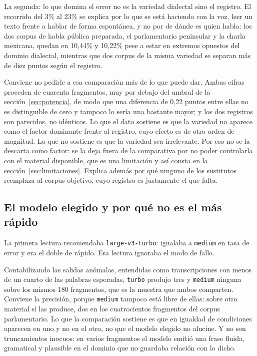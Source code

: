 La segunda: lo que domina el error no es la variedad dialectal sino el registro. El recorrido
del 3\% al 23\% se explica por lo que se está haciendo con la voz, leer un texto frente a
hablar de forma espontánea, y no por de dónde es quien habla: los dos corpus de habla
pública preparada, el parlamentario peninsular y la charla mexicana, quedan en 10,44\% y
10,22\% pese a estar en extremos opuestos del dominio dialectal, mientras que dos corpus de
la misma variedad se separan más de diez puntos según el registro.

Conviene no pedirle a esa comparación más de lo que puede dar. Ambas cifras proceden de
cuarenta fragmentos, muy por debajo del umbral de la sección~\ref{sec:potencia}, de modo que
una diferencia de 0,22 puntos entre ellas no es distinguible de cero y tampoco lo sería una
bastante mayor; y los dos registros son parecidos, no idénticos. Lo que el dato sostiene es
que la variedad no aparece como el factor dominante frente al registro, cuyo efecto es de
otro orden de magnitud. Lo que no sostiene es que la variedad sea irrelevante. Por eso no se
la descarta como factor: se la deja fuera de la comparativa por no poder controlarla con el
material disponible, que es una limitación y así consta en la sección~\ref{sec:limitaciones}.
Explica además por qué ninguno de los sustitutos reemplaza al corpus objetivo, cuyo registro
es justamente el que falta.

\subsection{El modelo elegido y por qué no es el más rápido}

La primera lectura recomendaba \texttt{large-v3-turbo}: igualaba a \texttt{medium} en tasa
de error y era el doble de rápido. Esa lectura ignoraba el modo de fallo.

Contabilizando las salidas anómalas, entendidas como transcripciones con menos de un cuarto
de las palabras esperadas, \texttt{turbo} produjo tres y \texttt{medium} ninguna sobre los
mismos 180 fragmentos, que es la muestra que ambos comparten. Conviene la precisión, porque
\texttt{medium} tampoco está libre de ellas: sobre otro material sí las produce, dos en los
cuatrocientos fragmentos del corpus parlamentario. Lo que la comparación sostiene es que en
igualdad de condiciones aparecen en uno y no en el otro, no que el modelo elegido no
alucine. Y no son truncamientos inocuos: en varios fragmentos el modelo emitió una frase
fluida, gramatical y plausible en el dominio que no guardaba relación con lo dicho.

